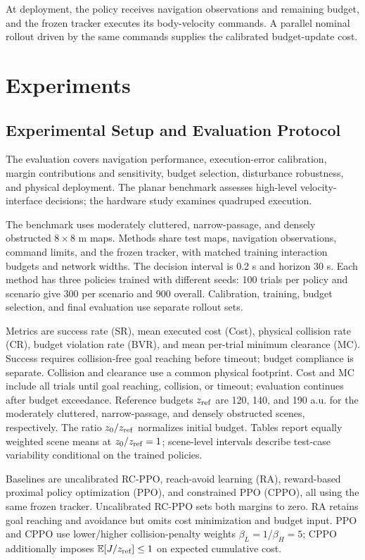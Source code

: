 \documentclass[conference]{IEEEtran}
\begin{document}
At deployment, the policy receives navigation observations and remaining budget,
and the frozen tracker executes its body-velocity commands. A parallel nominal
rollout driven by the same commands supplies the calibrated budget-update cost.

\section{Experiments}
\subsection{Experimental Setup and Evaluation Protocol}
\label{sec:experimental_setup}
The evaluation covers navigation performance, execution-error calibration, margin
contributions and sensitivity, budget selection, disturbance robustness, and
physical deployment. The planar benchmark assesses high-level velocity-interface
decisions; the hardware study examines quadruped execution.

The benchmark uses moderately cluttered, narrow-passage, and densely obstructed
$8\times8$ m maps. Methods share test maps, navigation observations, command
limits, and the frozen tracker, with matched training interaction budgets and network
widths. The decision interval is 0.2 s and horizon 30 s. Each method has three
policies trained with different seeds: 100 trials per policy and scenario give
300 per scenario and 900 overall. Calibration, training, budget selection, and
final evaluation use separate rollout sets.

Metrics are success rate (SR), mean executed cost (Cost), physical collision rate
(CR), budget violation rate (BVR), and mean per-trial minimum clearance (MC).
Success requires collision-free goal reaching before timeout; budget compliance
is separate. Collision and clearance use a common physical footprint. Cost and
MC include all trials until goal reaching, collision, or timeout; evaluation
continues after budget exceedance. Reference budgets $z_{\rm ref}$ are 120, 140,
and 190 a.u. for the moderately cluttered, narrow-passage, and densely obstructed
scenes, respectively. The ratio $z_0/z_{\rm ref}$ normalizes initial budget.
Tables report equally weighted scene means at $z_0/z_{\rm ref}=1$; scene-level
intervals describe test-case variability conditional on the trained policies.

Baselines are uncalibrated RC-PPO, reach-avoid learning (RA), reward-based proximal
policy optimization (PPO), and constrained PPO (CPPO), all using the same frozen
tracker. Uncalibrated RC-PPO sets both margins to zero. RA retains goal reaching and avoidance
but omits cost minimization and budget input. PPO and CPPO use lower/higher
collision-penalty weights $\beta_L=1$/$\beta_H=5$; CPPO additionally imposes
$\mathbb{E}[J/z_{\rm ref}]\leq1$ on expected cumulative cost.
\end{document}

